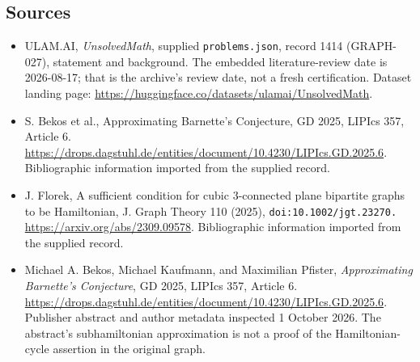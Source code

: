 \documentclass[11pt,a4paper]{article}
\begin{document}
\subsection{Sources}

{\small

\begin{itemize}

\item[\hypertarget{source:1414:1}{S1}] ULAM.AI, \emph{UnsolvedMath}, supplied \texttt{problems.json}, record 1414 (GRAPH-027), statement and background. The embedded literature-review date is 2026-08-17; that is the archive’s review date, not a fresh certification. Dataset landing page: \url{https://huggingface.co/datasets/ulamai/UnsolvedMath}.

\item[\hypertarget{source:1414:2}{S2}] S. Bekos et al., Approximating Barnette's Conjecture, GD 2025, LIPIcs 357, Article 6. \url{https://drops.dagstuhl.de/entities/document/10.4230/LIPIcs.GD.2025.6}. Bibliographic information imported from the supplied record.

\item[\hypertarget{source:1414:3}{S3}] J. Florek, A sufficient condition for cubic 3-connected plane bipartite graphs to be Hamiltonian, J. Graph Theory 110 (2025), \nolinkurl{doi:10.1002/jgt.23270.} \url{https://arxiv.org/abs/2309.09578}. Bibliographic information imported from the supplied record.


\item[E1] Michael A. Bekos, Michael Kaufmann, and
Maximilian Pfister, \emph{Approximating Barnette's Conjecture}, GD 2025,
LIPIcs 357, Article 6. \url{https://drops.dagstuhl.de/entities/document/10.4230/LIPIcs.GD.2025.6}.
Publisher abstract and author metadata inspected 1 October 2026.
The abstract's subhamiltonian approximation is not a proof of the
Hamiltonian-cycle assertion in the original graph.

\end{itemize}

}

\label{end:1414}
\end{document}
